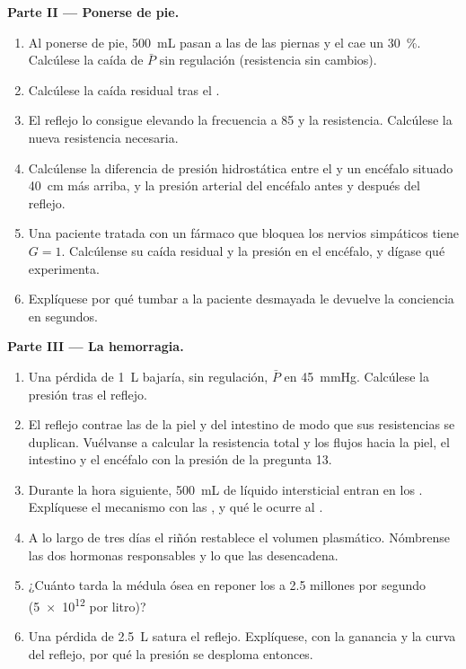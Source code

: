 \begin{problem}
\medskip
\noindent\textbf{Parte II --- Ponerse de pie.}
\begin{enumerate}[resume]
  \item Al ponerse de pie, \qty{500}{mL} pasan a las  de las piernas
        y el  cae un \qty{30}{\%}. Calcúlese la caída de
        $\bar P$ sin regulación (resistencia sin cambios).
  \item Calcúlese la caída residual tras el .
  \item El reflejo lo consigue elevando la frecuencia a 85 y la
        resistencia. Calcúlese la nueva resistencia necesaria.
  \item Calcúlense la diferencia de presión hidrostática entre el 
        y un encéfalo situado \qty{40}{cm} más arriba, y la presión arterial
        del encéfalo antes y después del reflejo.
  \item Una paciente tratada con un fármaco que bloquea los nervios
        simpáticos tiene $G = 1$. Calcúlense su caída residual y la presión
        en el encéfalo, y dígase qué experimenta.
  \item Explíquese por qué tumbar a la paciente desmayada le devuelve la
        conciencia en segundos.
\end{enumerate}

\medskip
\noindent\textbf{Parte III --- La hemorragia.}
\begin{enumerate}[resume]
  \item Una pérdida de \qty{1}{L} bajaría, sin regulación, $\bar P$ en
        \qty{45}{mmHg}. Calcúlese la presión tras el reflejo.
  \item El reflejo contrae las  de la piel y del intestino de modo
        que sus resistencias se duplican. Vuélvanse a calcular la
        resistencia total y los flujos hacia la piel, el intestino y el
        encéfalo con la presión de la pregunta 13.
  \item Durante la hora siguiente, \qty{500}{mL} de líquido intersticial
        entran en los . Explíquese el mecanismo con las , y qué le ocurre al .
  \item A lo largo de tres días el riñón restablece el volumen plasmático.
        Nómbrense las dos hormonas responsables y lo que las desencadena.
  \item ¿Cuánto tarda la médula ósea en reponer los  a
        \num{2.5} millones por segundo (\num{5e12} por litro)?
  \item Una pérdida de \qty{2.5}{L} satura el reflejo. Explíquese, con la
        ganancia y la curva del reflejo, por qué la presión se desploma
        entonces.
\end{enumerate}


\end{problem}

